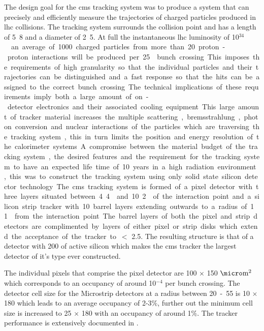 The design goal for the \ac{cms} tracking system was to produce a system that 
can precisely and efficiently measure the trajectories of charged particles 
produced in \ac{lhc} collisions. The tracking system surrounds the collision 
point and has a length of \unit{5.8}{\meter} and a diameter of 
\unit{2.5}{\meter}. At full the instantaneous \ac{lhc} luminosity of 
\unit{10$^{34}$}{\lumiunits} an average of 1000 charged particles from more 
than 20 proton-proton interactions will be produced per \unit{25}{\nano\second} 
bunch crossing. This imposes the requirements of high granularity so that the 
individual particles and their trajectories can be distinguished and a fast 
response so that the hits can be assigned to the correct bunch crossing. The 
technical implications of these requirements imply both a large amount of 
on-detector electronics and their associated cooling equipment. This large 
amount of tracker material increases the multiple scattering, bremsstrahlung, 
photon conversion and nuclear interactions of the particles which are 
traversing the tracking system, this in turn limits the position and energy 
resolution of the calorimeter systems. A compromise between the material budget 
of the tracking system, the desired features and the requirement for the 
tracking system to have an expected life time of 10 years in a high radiation 
environment, this was to construct the tracking system using only solid state 
silicon detector technology.

The \ac{cms} tracking system is formed of a pixel detector with three layers 
situated between \unit{4.4}{\cm} and \unit{10.2}{\cm} of the interaction point 
and a silicon strip tracker with 10 barrel layers extending outwards to a 
radius of \unit{1.1}{\meter} from the interaction point. The barrel layers of 
both the pixel and strip detectors are complimented by layers of either pixel 
or strip disks which extend the acceptance of the tracker to \mETA $<$ 2.5. The 
resulting structure is that of a detector with \unit{200}{\squaremetre} of 
active silicon which makes the \ac{cms} tracker the largest detector of it's 
type ever constructed.

The individual pixels that comprise the pixel detector are 100 $\times$ 
150 $\micro\textrm{m}^{2}$ which corresponds to an occupancy of around 10$^{-4}$ 
per bunch crossing. The detector cell size for the Microstrip detectors at a 
radius between \unit{20-55}{\cm} is \unit{10}{\cm} $\times$ 
\unit{180}{\micro\meter} which leads to an average occupancy of 2-3$\%$, 
further out the minimum cell size is increased to \unit{25}{\cm} $\times$ 
\unit{180}{\micro\meter} with an occupancy of around 1$\%$. The tracker 
performance is extensively documented in \cite{cmstracking}.

